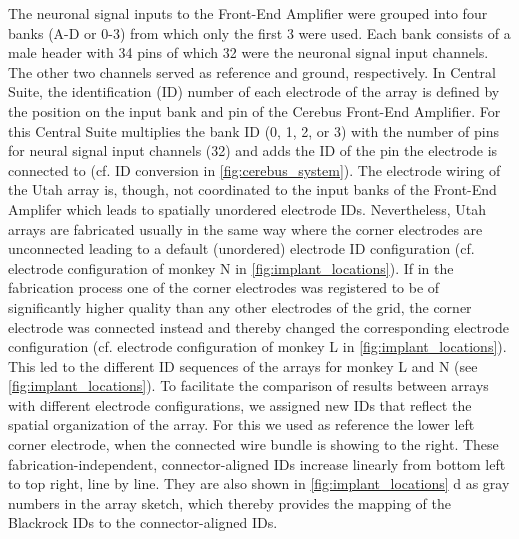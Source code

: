 The neuronal signal inputs to the Front-End Amplifier were grouped into four banks (A-D or 0-3) from which only the first 3 were used. Each bank consists of a male header with 34 pins of which 32 were the neuronal signal input channels. The other two channels served as reference and ground, respectively. In Central Suite, the identification (ID) number of each electrode of the array is defined by the position on the input bank and pin of the Cerebus Front-End Amplifier. For this Central Suite multiplies the bank ID (0, 1, 2, or 3) with the number of pins for neural signal input channels (32) and adds the ID of the pin the electrode is connected to (cf. ID conversion in \cref{fig:cerebus_system}). The electrode wiring of the Utah array is, though, not coordinated to the input banks of the Front-End Amplifer which leads to spatially unordered electrode IDs. Nevertheless, Utah arrays are fabricated usually in the same way where the corner electrodes are unconnected leading to a default (unordered) electrode ID configuration (cf. electrode configuration of monkey N in \cref{fig:implant_locations}). If in the fabrication process one of the corner electrodes was registered to be of significantly higher quality than any other electrodes of the grid, the corner electrode was connected instead and thereby changed the corresponding electrode configuration (cf. electrode configuration of monkey L in \cref{fig:implant_locations}). This led to the different ID sequences of the arrays for monkey L and N (see \cref{fig:implant_locations}). To facilitate the comparison of results between arrays with different electrode configurations, we assigned new IDs that reflect the spatial organization of the array. For this we used as reference the lower left corner electrode, when the connected wire bundle is showing to the right. These fabrication-independent, connector-aligned IDs increase linearly from bottom left to top right, line by line. They are also shown in \cref{fig:implant_locations} d as gray numbers in the array sketch, which thereby provides the mapping of the Blackrock IDs to the connector-aligned IDs. 

